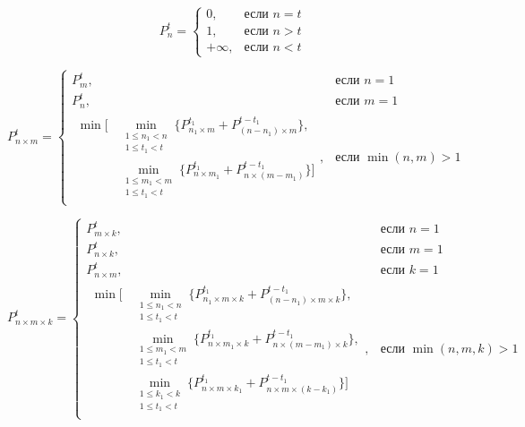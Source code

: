 \begin{equation}
P_n^t =
	\begin{cases}
		0, & \text{если } n = t \\[-8pt]
		1, & \text{если } n > t \\[-8pt]
		+\infty, & \text{если } n < t
	\end{cases}
\end{equation}

\begin{equation}
P_{n \times m}^t =
	\begin{cases}
		P_m^t, & \text{если } n = 1 \\
		P_n^t, & \text{если } m = 1 \\
		\begin{aligned}
			\min\big[
				& \min_{\substack{1 \le n_1 < n \\ 1 \le t_1 < t}}{\{P_{n_1 \times m}^{t_1} + P_{(n - n_1) \times m}^{t - t_1}\}}, \\[-8pt]
				& \min_{\substack{1 \le m_1 < m \\ 1 \le t_1 < t}}{\{P_{n \times m_1}^{t_1} + P_{n \times (m - m_1)}^{t - t_1}\}}
			\big]
		\end{aligned}, & \text{если } \min(n, m) > 1
	\end{cases}
\end{equation}

\begin{equation}
P_{n \times m \times k}^t =
	\begin{cases}
		P_{m \times k}^t, & \text{если } n = 1 \\
		P_{n \times k}^t, & \text{если } m = 1 \\
		P_{n \times m}^t, & \text{если } k = 1 \\
		\begin{aligned}
			\min\big[
				& \min_{\substack{1 \le n_1 < n \\ 1 \le t_1 < t}}{\{P_{n_1 \times m \times k}^{t_1} + P_{(n - n_1) \times m \times k}^{t - t_1}\}}, \\[-8pt]
				& \min_{\substack{1 \le m_1 < m \\ 1 \le t_1 < t}}{\{P_{n \times m_1 \times k}^{t_1} + P_{n \times (m - m_1) \times k}^{t - t_1}\}}, \\[-8pt]
				& \min_{\substack{1 \le k_1 < k \\ 1 \le t_1 < t}}{\{P_{n \times m \times k_1}^{t_1} + P_{n \times m \times (k - k_1)}^{t - t_1}\}}
			\big]
		\end{aligned}, & \text{если } \min(n, m, k) > 1
	\end{cases}
\end{equation}

